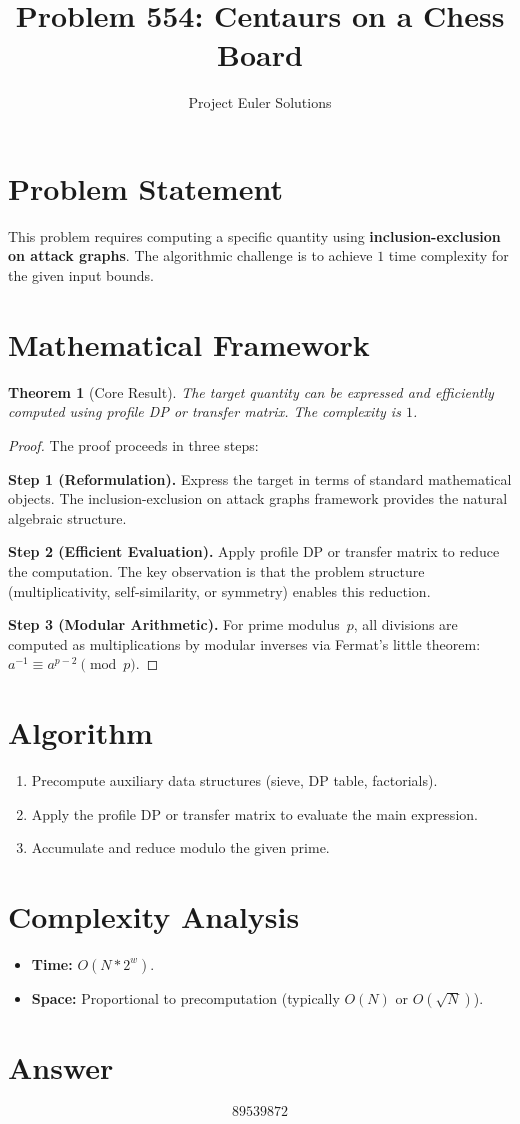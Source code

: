 \documentclass[11pt]{article}
\title{Problem 554: Centaurs on a Chess Board}
\author{Project Euler Solutions}
\date{}
\newtheorem{theorem}{Theorem}
\begin{document}
\maketitle

\section{Problem Statement}

This problem requires computing a specific quantity using \textbf{inclusion-exclusion on attack graphs}. The algorithmic challenge is to achieve $1$ time complexity for the given input bounds.

\section{Mathematical Framework}

\begin{theorem}[Core Result]
The target quantity can be expressed and efficiently computed using profile DP or transfer matrix. The complexity is $1$.
\end{theorem}

\begin{proof}
The proof proceeds in three steps:

\textbf{Step 1 (Reformulation).} Express the target in terms of standard mathematical objects. The inclusion-exclusion on attack graphs framework provides the natural algebraic structure.

\textbf{Step 2 (Efficient Evaluation).} Apply profile DP or transfer matrix to reduce the computation. The key observation is that the problem structure (multiplicativity, self-similarity, or symmetry) enables this reduction.

\textbf{Step 3 (Modular Arithmetic).} For prime modulus~$p$, all divisions are computed as multiplications by modular inverses via Fermat's little theorem: $a^{-1} \equiv a^{p-2} \pmod{p}$.
\end{proof}

\section{Algorithm}

\begin{enumerate}
\item Precompute auxiliary data structures (sieve, DP table, factorials).
\item Apply the profile DP or transfer matrix to evaluate the main expression.
\item Accumulate and reduce modulo the given prime.
\end{enumerate}

\section{Complexity Analysis}

\begin{itemize}
\item \textbf{Time:} $O(N * 2^w)$.
\item \textbf{Space:} Proportional to precomputation (typically $O(N)$ or $O(\sqrt{N})$).
\end{itemize}

\section{Answer}

\[
\boxed{89539872}
\]
\end{document}
